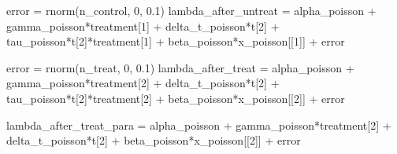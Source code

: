 \documentclass[
]{article}
\newenvironment{Shaded}{\begin{snugshade}}{\end{snugshade}}
\newcommand{\DecValTok}[1]{\textcolor[rgb]{0.00,0.00,0.81}{#1}}
\newcommand{\FloatTok}[1]{\textcolor[rgb]{0.00,0.00,0.81}{#1}}
\newcommand{\FunctionTok}[1]{\textcolor[rgb]{0.00,0.00,0.00}{#1}}
\newcommand{\NormalTok}[1]{#1}
\newcommand{\OtherTok}[1]{\textcolor[rgb]{0.56,0.35,0.01}{#1}}
\newcommand{\SpecialCharTok}[1]{\textcolor[rgb]{0.00,0.00,0.00}{#1}}
\begin{document}
\begin{Shaded}
\begin{Highlighting}[]
\NormalTok{error }\OtherTok{=} \FunctionTok{rnorm}\NormalTok{(n\_control, }\DecValTok{0}\NormalTok{, }\FloatTok{0.1}\NormalTok{)}
\NormalTok{lambda\_after\_untreat }\OtherTok{=}\NormalTok{ alpha\_poisson }\SpecialCharTok{+}\NormalTok{ gamma\_poisson}\SpecialCharTok{*}\NormalTok{treatment[}\DecValTok{1}\NormalTok{] }\SpecialCharTok{+}\NormalTok{ delta\_t\_poisson}\SpecialCharTok{*}\NormalTok{t[}\DecValTok{2}\NormalTok{] }\SpecialCharTok{+} 
\NormalTok{  tau\_poisson}\SpecialCharTok{*}\NormalTok{t[}\DecValTok{2}\NormalTok{]}\SpecialCharTok{*}\NormalTok{treatment[}\DecValTok{1}\NormalTok{] }\SpecialCharTok{+}\NormalTok{ beta\_poisson}\SpecialCharTok{*}\NormalTok{x\_poisson[[}\DecValTok{1}\NormalTok{]] }\SpecialCharTok{+}\NormalTok{ error}

\NormalTok{error }\OtherTok{=} \FunctionTok{rnorm}\NormalTok{(n\_treat, }\DecValTok{0}\NormalTok{, }\FloatTok{0.1}\NormalTok{)}
\NormalTok{lambda\_after\_treat }\OtherTok{=}\NormalTok{ alpha\_poisson }\SpecialCharTok{+}\NormalTok{ gamma\_poisson}\SpecialCharTok{*}\NormalTok{treatment[}\DecValTok{2}\NormalTok{] }\SpecialCharTok{+}\NormalTok{ delta\_t\_poisson}\SpecialCharTok{*}\NormalTok{t[}\DecValTok{2}\NormalTok{] }\SpecialCharTok{+} 
\NormalTok{  tau\_poisson}\SpecialCharTok{*}\NormalTok{t[}\DecValTok{2}\NormalTok{]}\SpecialCharTok{*}\NormalTok{treatment[}\DecValTok{2}\NormalTok{] }\SpecialCharTok{+}\NormalTok{ beta\_poisson}\SpecialCharTok{*}\NormalTok{x\_poisson[[}\DecValTok{2}\NormalTok{]] }\SpecialCharTok{+}\NormalTok{ error}

\NormalTok{lambda\_after\_treat\_para }\OtherTok{=}\NormalTok{ alpha\_poisson }\SpecialCharTok{+}\NormalTok{ gamma\_poisson}\SpecialCharTok{*}\NormalTok{treatment[}\DecValTok{2}\NormalTok{] }\SpecialCharTok{+}\NormalTok{ delta\_t\_poisson}\SpecialCharTok{*}\NormalTok{t[}\DecValTok{2}\NormalTok{] }\SpecialCharTok{+}
\NormalTok{  beta\_poisson}\SpecialCharTok{*}\NormalTok{x\_poisson[[}\DecValTok{2}\NormalTok{]] }\SpecialCharTok{+}\NormalTok{ error}
\end{Highlighting}
\end{Shaded}
\end{document}
